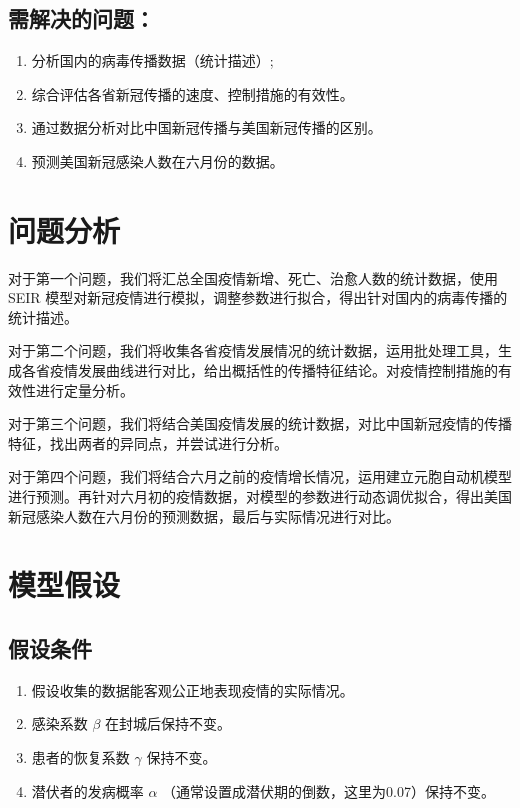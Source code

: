 \documentclass[UTF8]{ctexart}
\begin{document}

\subsection{需解决的问题：}
\begin{enumerate}
    \item 分析国内的病毒传播数据（统计描述）; 
    \item 综合评估各省新冠传播的速度、控制措施的有效性。 
    \item 通过数据分析对比中国新冠传播与美国新冠传播的区别。
    \item 预测美国新冠感染人数在六月份的数据。 
\end{enumerate}
\section{问题分析}
对于第一个问题，我们将汇总全国疫情新增、死亡、治愈人数的统计数据，使用 SEIR 模型对新冠疫情进行模拟，调整参数进行拟合，得出针对国内的病毒传播的统计描述。
\par 对于第二个问题，我们将收集各省疫情发展情况的统计数据，运用批处理工具，生成各省疫情发展曲线进行对比，给出概括性的传播特征结论。对疫情控制措施的有效性进行定量分析。
\par 对于第三个问题，我们将结合美国疫情发展的统计数据，对比中国新冠疫情的传播特征，找出两者的异同点，并尝试进行分析。
\par 对于第四个问题，我们将结合六月之前的疫情增长情况，运用建立元胞自动机模型进行预测。再针对六月初的疫情数据，对模型的参数进行动态调优拟合，得出美国新冠感染人数在六月份的预测数据，最后与实际情况进行对比。


\section{模型假设}
\subsection{假设条件}
\begin{enumerate}
    \item   假设收集的数据能客观公正地表现疫情的实际情况。
    \item 	感染系数 $\beta$ 在封城后保持不变。
    \item 	患者的恢复系数 $\gamma$ 保持不变。
    \item 	潜伏者的发病概率 $\alpha$ （通常设置成潜伏期的倒数，这里为0.07）保持不变。
\end{enumerate}
\end{document}

